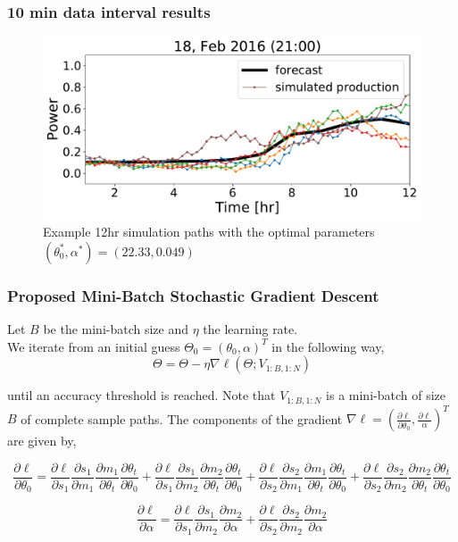 \documentclass[aspectratio=169]{beamer}\usepackage[utf8]{inputenc}
\begin{document}
\begin{frame}\frametitle{ 10 min data interval results  }
\begin{figure} %
\begin{center}
\includegraphics[width=0.8\linewidth]{plots_SGD/105.pdf}
\end{center}
   \caption{ Example 12hr simulation paths with the optimal parameters $(\theta_0^*, \alpha^*) = (22.33,  0.049)$}
\label{100samples}
\end{figure}
\end{frame}

\begin{frame}\frametitle{ Proposed Mini-Batch Stochastic Gradient Descent }
Let $B$ be the mini-batch size and $\eta$ the learning rate.\\

We iterate from an initial guess $\Theta_0 = (\theta_0 , \alpha)^T$ in the following way,
\begin{equation}
  \Theta = \Theta  - \eta \nabla \ell  \left( \Theta ; V_{1:B, 1:N} \right)
\end{equation}

until an accuracy threshold is reached. Note that $V_{1:B, 1:N}$ is a mini-batch of size $B$ of complete sample paths. The components of the gradient $\nabla \ell = (\frac{\partial \ell }{\partial \theta_0},\frac{\partial \ell}{\alpha} )^T$ are given by,

\begin{equation*}
\frac{\partial \ell }{\partial \theta_0} = \frac{\partial \ell }{\partial s_1}\frac{\partial s_1 }{\partial m_1}\frac{\partial m_1 }{\partial \theta_t}\frac{\partial \theta_t }{\partial \theta_0} + \frac{\partial \ell }{\partial s_1}\frac{\partial s_1 }{\partial m_2}\frac{\partial m_2 }{\partial \theta_t}\frac{\partial \theta_t }{\partial \theta_0} + \frac{\partial \ell }{\partial s_2}\frac{\partial s_2 }{\partial m_1}\frac{\partial m_1 }{\partial \theta_t}\frac{\partial \theta_t }{\partial \theta_0} + \frac{\partial \ell }{\partial s_2}\frac{\partial s_2 }{\partial m_2}\frac{\partial m_2 }{\partial \theta_t}\frac{\partial \theta_t }{\partial \theta_0}
\end{equation*}

\begin{equation*}
\frac{\partial \ell }{\partial \alpha} =  \frac{\partial \ell }{\partial s_1}\frac{\partial s_1 }{\partial m_2}\frac{\partial m_2 }{\partial \alpha} + \frac{\partial \ell }{\partial s_2}\frac{\partial s_2 }{\partial m_2}\frac{\partial m_2 }{\partial \alpha}
\end{equation*}

\end{frame}
\end{document}
